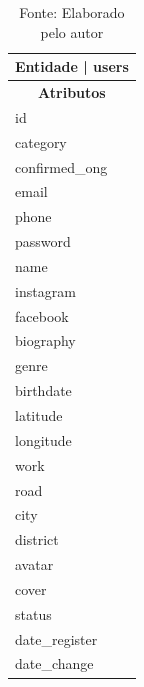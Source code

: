 \begin{table}[htb]
  \centering
  \caption{Relação de entidades e seus atributos tabela users}
  \begin{tabular}{|p{4cm}|}
    \hline
    \multicolumn{2}{|c|}{\textbf{Entidade} | \textbf{users}} \\
    \hline
    \multicolumn{1}{|c|}{\textbf{Atributos}} \\
    \hline
    id \\
    \hline
    category \\
    \hline
    confirmed\_ong \\
    email \\
    \hline
    phone \\
    \hline
    password \\
    \hline
    name \\
    \hline
    instagram \\
    \hline
    facebook \\
    \hline
    biography \\
    \hline
    genre \\
    \hline
    birthdate \\
    \hline
    latitude \\
    \hline
    longitude \\
    \hline
    work \\
    \hline
    road \\
    \hline
    city \\
    \hline
    district \\
    \hline
    avatar \\
    \hline
    cover \\
    \hline
    status \\
    \hline
    date\_register \\
    \hline
    date\_change \\
    \hline
   \hline
  \end{tabular}
  \caption*{\small Fonte: Elaborado pelo autor}
  \label{tab:Plataformas1}
\end{table}

